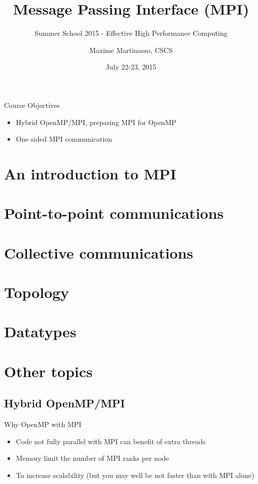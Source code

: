 \documentclass[aspectratio=43]{beamer}
\author{Maxime Martinasso, CSCS}
\title{Message Passing Interface (MPI)}
\subtitle{Summer School 2015 - Effective High Performance Computing}
\date{July 22-23, 2015}
\begin{document}
\cscstitle

\begin{frame}{Course Objectives}
\begin{itemize}
\item Hybrid OpenMP/MPI, preparing MPI for OpenMP
\item One sided MPI communication
\end{itemize}
\end{frame}


\section{An introduction to MPI}
\section{Point-to-point communications}
\section{Collective communications}
\section{Topology}
\section{Datatypes}
\section{Other topics}


\subsection{Hybrid OpenMP/MPI}

\begin{frame}[fragile]{Why OpenMP with MPI}
\begin{itemize}
\item Code not fully parallel with MPI can benefit of extra threads
\item Memory limit the number of MPI ranks per node
\item To increase scalability (but you may well be not faster than with MPI alone)
\end{itemize}
\end{frame}
\end{document}
